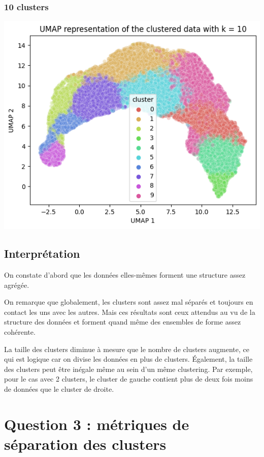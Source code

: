 \documentclass{article}
\begin{document}
\subsubsection*{10 clusters}

\begin{center}
    \includegraphics[scale=0.5]{./img/umap_10.png}
\end{center}

\subsection*{Interprétation}

On constate d'abord que les données elles-mêmes forment une structure assez agrégée.

On remarque que globalement, les clusters sont assez mal séparés et toujours en contact
les uns avec les autres. Mais ces résultats sont ceux attendus au vu de la structure des
données et forment quand même des ensembles de forme assez cohérente.

La taille des clusters diminue à mesure que le nombre de clusters augmente, ce qui est
logique car on divise les données en plus de clusters. Également, la taille des clusters
peut être inégale même au sein d'un même clustering. Par exemple, pour le cas avec 2 clusters,
le cluster de gauche contient plus de deux fois moins de données que le cluster de droite.
\newpage

\section*{Question 3 : métriques de séparation des clusters}
\end{document}
